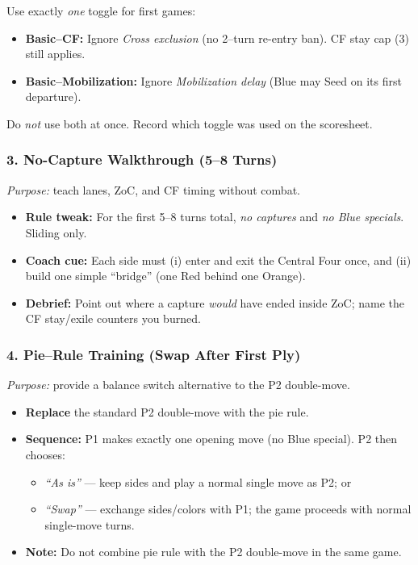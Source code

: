 \documentclass[11pt]{article}
\begin{document}
\begin{rulevariant}[title={Basic Mode (Teaching Toggles)}]
Use exactly \emph{one} toggle for first games:
\begin{itemize}\itemsep0.2em
  \item \textbf{Basic–CF:} Ignore \emph{Cross exclusion} (no 2–turn re-entry ban). CF stay cap (3) still applies.
  \item \textbf{Basic–Mobilization:} Ignore \emph{Mobilization delay} (Blue may Seed on its first departure).
\end{itemize}
Do \emph{not} use both at once. Record which toggle was used on the scoresheet.
\end{rulevariant}

\subsubsection*{3. No-Capture Walkthrough (5–8 Turns)}
\textit{Purpose:} teach lanes, ZoC, and CF timing without combat.
\begin{itemize}[leftmargin=1.3em]
  \item \textbf{Rule tweak:} For the first 5–8 turns total, \emph{no captures} and \emph{no Blue specials}. Sliding only.
  \item \textbf{Coach cue:} Each side must (i) enter and exit the Central Four once, and (ii) build one simple “bridge” (one Red behind one Orange).
  \item \textbf{Debrief:} Point out where a capture \emph{would} have ended inside ZoC; name the CF stay/exile counters you burned.
\end{itemize}

\subsubsection*{4. Pie–Rule Training (Swap After First Ply)}
\textit{Purpose:} provide a balance switch alternative to the P2 double-move.
\begin{itemize}[leftmargin=1.3em]
  \item \textbf{Replace} the standard P2 double-move with the pie rule.
  \item \textbf{Sequence:} P1 makes exactly one opening move (no Blue special). P2 then chooses:
    \begin{itemize}
      \item \emph{“As is”} — keep sides and play a normal single move as P2; or
      \item \emph{“Swap”} — exchange sides/colors with P1; the game proceeds with normal single-move turns.
    \end{itemize}
  \item \textbf{Note:} Do not combine pie rule with the P2 double-move in the same game.
\end{itemize}
\end{document}
